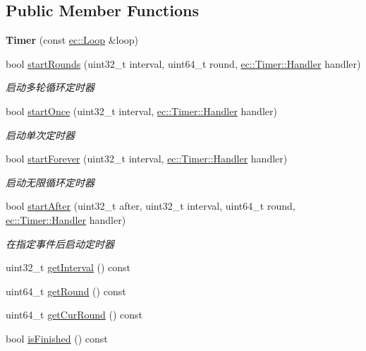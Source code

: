 \subsection*{Public Member Functions}
\begin{DoxyCompactItemize}
\item 
\hypertarget{classec_1_1Timer_a85cc8b047f79f6017b865e3921eb0e95}{{\bfseries Timer} (const \hyperlink{classec_1_1Loop}{ec\-::\-Loop} \&loop)}\label{classec_1_1Timer_a85cc8b047f79f6017b865e3921eb0e95}

\item 
bool \hyperlink{classec_1_1Timer_ad48f591873f207f843a3fc8b306063bf}{start\-Rounds} (uint32\-\_\-t interval, uint64\-\_\-t round, \hyperlink{classec_1_1Timer_acbf2889a6472ca60ce4d3c8856b717c5}{ec\-::\-Timer\-::\-Handler} handler)
\begin{DoxyCompactList}\small\item\em 启动多轮循环定时器 \end{DoxyCompactList}\item 
bool \hyperlink{classec_1_1Timer_af066807719d25dd78919346b1bc28d17}{start\-Once} (uint32\-\_\-t interval, \hyperlink{classec_1_1Timer_acbf2889a6472ca60ce4d3c8856b717c5}{ec\-::\-Timer\-::\-Handler} handler)
\begin{DoxyCompactList}\small\item\em 启动单次定时器 \end{DoxyCompactList}\item 
bool \hyperlink{classec_1_1Timer_ac103f227ad5f5bd44a29c24e37aabc20}{start\-Forever} (uint32\-\_\-t interval, \hyperlink{classec_1_1Timer_acbf2889a6472ca60ce4d3c8856b717c5}{ec\-::\-Timer\-::\-Handler} handler)
\begin{DoxyCompactList}\small\item\em 启动无限循环定时器 \end{DoxyCompactList}\item 
bool \hyperlink{classec_1_1Timer_a3bbcca634bad30417438a085abe31d25}{start\-After} (uint32\-\_\-t after, uint32\-\_\-t interval, uint64\-\_\-t round, \hyperlink{classec_1_1Timer_acbf2889a6472ca60ce4d3c8856b717c5}{ec\-::\-Timer\-::\-Handler} handler)
\begin{DoxyCompactList}\small\item\em 在指定事件后启动定时器 \end{DoxyCompactList}\item 
uint32\-\_\-t \hyperlink{classec_1_1Timer_ab41f5acea6407574f263ec79e080d764}{get\-Interval} () const 
\item 
uint64\-\_\-t \hyperlink{classec_1_1Timer_a1803715952c90a30cb4934e84cb132a1}{get\-Round} () const 
\item 
uint64\-\_\-t \hyperlink{classec_1_1Timer_a448659b37455abd3452a8d9cfe3587e3}{get\-Cur\-Round} () const 
\item 
bool \hyperlink{classec_1_1Timer_a97095d71c497ae7e47b01bffb9383542}{is\-Finished} () const 
\end{DoxyCompactItemize}



